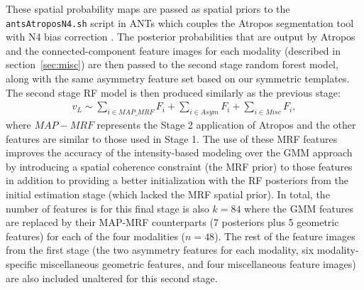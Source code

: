 \documentclass[preprint,authoryear,review,12pt]{elsarticle}
\begin{document}
These spatial probability maps are passed as spatial priors to the
{\tt antsAtroposN4.sh} script in ANTs which couples the Atropos 
segmentation tool \citep{avants2011} with N4 bias correction \citep{tustison2010}.
The posterior probabilities that are output by Atropos and the
connected-component feature images for each modality (described in
section~\ref{sec:misc}) are then passed to the second stage random
forest model, along with the same asymmetry feature set based on our
symmetric templates.  
The second stage RF model is then produced similarly as the previous stage: 
\begin{align}
\label{eq:mapmrf}
v_L \sim \sum_{i \in MAP\_MRF} F_i + \sum_{i \in Asym} F_i + \sum_{i \in Misc} F_i,
\end{align}
where $MAP-MRF$ represents the Stage 2 application of Atropos and the
other features are similar to those used in Stage 1.
The use of these MRF features improves the accuracy of the 
intensity-based modeling over the GMM approach by introducing
a spatial coherence constraint (the MRF prior) to those features 
in addition to 
providing a better initialization with the RF posteriors from 
the initial estimation stage (which lacked the MRF spatial prior).  
In total, the number of features is for this final stage is also $k=84$ 
where the GMM features are replaced by their MAP-MRF counterparts
(7 posteriors plus 5 geometric features) for each of the four modalities ($n=48$).
The rest of the feature images from the first stage
(the two asymmetry features for each modality, six modality-specific 
miscellaneous geometric features, and four miscellaneous feature
images) are also included unaltered for this second stage.
\end{document}
